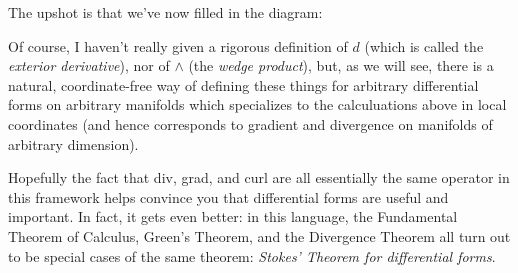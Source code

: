 The upshot is that we've now filled in the diagram:

\begin{center}
\end{center}

Of course, I haven't really given a rigorous definition of $d$ (which is called the \emph{exterior derivative}), nor of $\wedge$ (the \emph{wedge product}), but, as we will see, there is a natural, coordinate-free way of defining these things for arbitrary differential forms on arbitrary manifolds which specializes to the calculuations above in local coordinates (and hence corresponds to gradient and divergence on manifolds of arbitrary dimension).

Hopefully the fact that div, grad, and curl are all essentially the same operator in this framework helps convince you that differential forms are useful and important. In fact, it gets even better: in this language, the Fundamental Theorem of Calculus, Green's Theorem, and the Divergence Theorem all turn out to be special cases of the same theorem: \emph{Stokes' Theorem for differential forms}.

